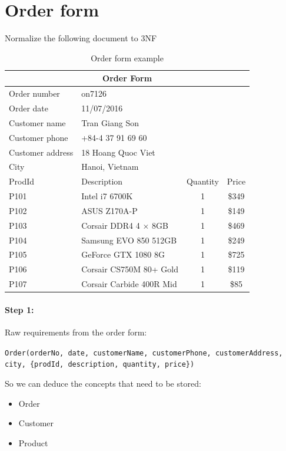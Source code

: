 \documentclass{assignment}
\begin{document}
\section*{Order form}
Normalize the following document to 3NF
\begin{table}[H]
    \begin{center}
        \begin{tabular}{|l|l|c|c|}
            \hline
            \multicolumn{4}{|c|}{Order Form} \\ \hline
            \multicolumn{1}{|l}{Order number} & \multicolumn{3}{l|}{on7126} \\
            \multicolumn{1}{|l}{Order date} & \multicolumn{3}{l|}{11/07/2016} \\
            \multicolumn{1}{|l}{Customer name} & \multicolumn{3}{l|}{Tran
            Giang Son} \\
            \multicolumn{1}{|l}{Customer phone} & \multicolumn{3}{l|}{+84-4
            37 91 69 60} \\
            \multicolumn{1}{|l}{Customer address} & \multicolumn{3}{l|}{18
            Hoang Quoc Viet} \\
            \multicolumn{1}{|l}{City} & \multicolumn{3}{l|}{Hanoi,
            Vietnam} \\ \hline
            ProdId & Description & Quantity & Price \\ \hline
            P101 & Intel i7 6700K & 1 & \$349 \\ \hline
            P102 & ASUS Z170A-P & 1 & \$149 \\ \hline
            P103 & Corsair DDR4 4 $\times$ 8GB & 1 & \$469 \\ \hline
            P104 & Samsung EVO 850 512GB & 1 & \$249 \\ \hline
            P105 & GeForce GTX 1080 8G & 1 & \$725 \\ \hline
            P106 & Corsair CS750M 80+ Gold & 1 & \$119 \\ \hline
            P107 & Corsair Carbide 400R Mid & 1 & \$85 \\ \hline
        \end{tabular}
    \end{center}

    \caption{Order form example}
\end{table}

\paragraph{Step 1:} Raw requirements from the order form:
\begin{framed}
    \texttt{Order(orderNo, date, customerName, customerPhone,
    customerAddress, city, \{prodId, description, quantity, price\})}
\end{framed}
So we can deduce the concepts that need to be stored:
\begin{itemize}[noitemsep]
    \item Order
    \item Customer
    \item Product
\end{itemize}
\end{document}
